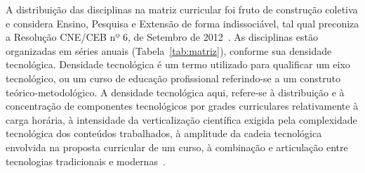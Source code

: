 \documentclass[11pt,fleqn]{book} %
\begin{document}
A distribuição das disciplinas na matriz curricular foi fruto de construção coletiva e considera Ensino, Pesquisa e Extensão de forma indissociável, tal qual preconiza  a Resolução CNE/CEB nº 6, de Setembro de 2012~\cite{Resolucao06De2012}.
As disciplinas estão organizadas em séries anuais (Tabela~\ref{tab:matriz}), conforme sua densidade tecnológica.
Densidade tecnológica é um termo utilizado para qualificar um eixo tecnológico, ou um curso de educação profissional referindo-se a um construto teórico-metodológico. 
A densidade tecnológica aqui, refere-se à distribuição e à concentração de componentes tecnológicos por grades curriculares relativamente à carga horária, à intensidade da verticalização científica exigida pela complexidade tecnológica dos conteúdos trabalhados, à amplitude da cadeia tecnológica envolvida na proposta curricular de um curso, à combinação e articulação entre tecnologias tradicionais e modernas~\cite{Machado2010}.

\end{document}
